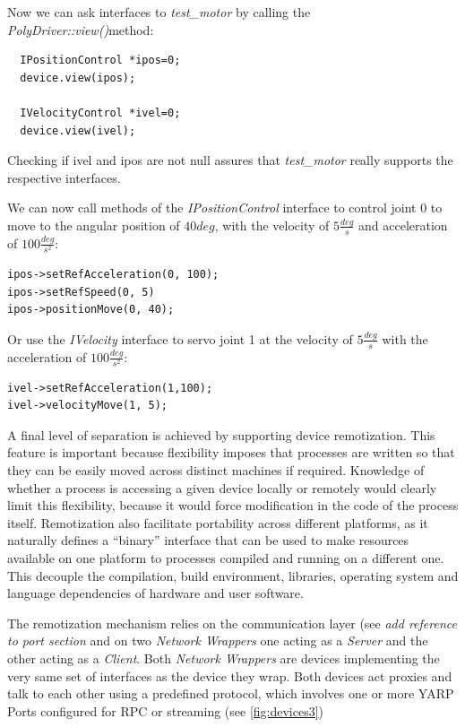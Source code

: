 Now we can ask interfaces to \emph{test\_motor} by calling the 
\emph{PolyDriver::view()}method:

\begin{verbatim}
  IPositionControl *ipos=0;
  device.view(ipos);

  IVelocityControl *ivel=0;
  device.view(ivel);
\end{verbatim}

Checking if ivel and ipos are not null assures that \emph{test\_motor} really supports
the respective interfaces.

We can now call methods of the \emph{IPositionControl} interface to control 
joint $0$ to move to the angular position of $40deg$, with the velocity of $5\frac{deg}{s}$ and acceleration of $100\frac{deg}{s^2}$:

\begin{verbatim}
ipos->setRefAcceleration(0, 100);
ipos->setRefSpeed(0, 5)
ipos->positionMove(0, 40);
\end{verbatim}

Or use the \emph{IVelocity} interface to servo joint 1 at the velocity of 
$5\frac{deg}{s}$ with the acceleration of $100\frac{deg}{s^2}$:

\begin{verbatim}
ivel->setRefAcceleration(1,100);
ivel->velocityMove(1, 5);
\end{verbatim}


A final level of separation is achieved by supporting device remotization. 
This feature is important because flexibility imposes 
that processes are written so that they can be easily moved across distinct machines 
if required. Knowledge of whether a process is accessing a given device locally or 
remotely would clearly limit this flexibility, because it would force modification 
in the code of the process itself. Remotization also facilitate portability 
across different platforms, as it naturally defines a ``binary'' interface that can 
be used to make resources available on one platform to processes compiled and running 
on a different one. This decouple the compilation, build environment, libraries, 
operating system and language dependencies of hardware and user software.

The remotization mechanism relies on the communication layer (see \emph{add 
reference to port section} and on two \emph{Network Wrappers} one acting as a 
\emph{Server} and the other acting as a \emph{Client}. Both \emph{Network Wrappers} 
are devices implementing the very same set of interfaces as the device they wrap. 
Both devices act proxies and talk to each other using a predefined 
protocol, which involves one or more YARP Ports configured for RPC or streaming
(see \ref{fig:devices3})

